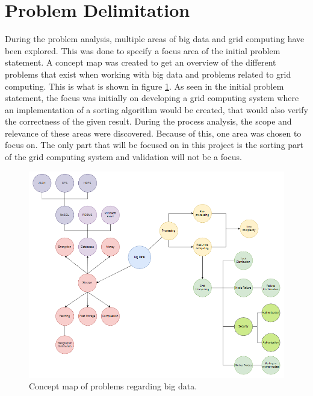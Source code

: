 \section{Problem Delimitation}
During the problem analysis, multiple areas of big data and grid computing have been explored. This was done to specify a focus area of the initial problem statement. A concept map was created to get an overview of the different problems that exist when working with big data and problems related to grid computing. This is what is shown in figure \ref{fig:concept_map}. As seen in the initial problem statement, the focus was initially on developing a grid computing system where an implementation of a sorting algorithm would be created, that would also verify the correctness of the given result. During the process analysis, the scope and relevance of these areas were discovered. Because of this, one area was chosen to focus on. The only part that will be focused on in this project is the sorting part of the grid computing system and validation will not be a focus.


\begin{figure}[H]
    \centering
    \includegraphics[scale=0.95]{figures/concept_map.png}
    \caption{Concept map of problems regarding big data.}
    \label{fig:concept_map}
\end{figure}